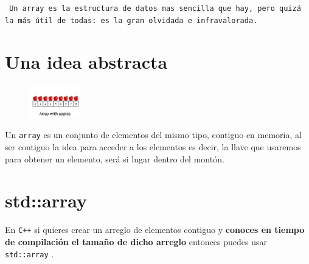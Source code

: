 \documentclass[12pt, fleqn]{report}                             %
\theoremstyle{break}                                            %
\newcommand{\textCode}[1]  { \texttt{#1} }                      %
\newcommand{\Cpp}{\ignorespaces\textCode{C++}}                  %
\begin{document}
        {
            \large
            \textCode{
                Un array es la estructura de datos mas sencilla que hay, pero quizá la más útil
                de todas: es la gran olvidada e infravalorada.
            }
        }

        \clearpage
        \section{Una idea abstracta}

            \begin{figure}
                \includegraphics[width=0.2\textwidth]{ArrayApples}
            \end{figure}

            Un \textCode{array} es un conjunto de elementos del mismo tipo, contiguo en memoria,
            al ser contiguo la idea para acceder a los elementos es decir, la llave que usaremos para 
            obtener un elemento, será si lugar dentro del montón.

        
        \section{std::array}

            En \Cpp si quieres crear un arreglo de elementos contiguo y \textbf{conoces 
            en tiempo de compilación el tamaño de dicho arreglo} entonces puedes usar
            \textCode{std::array}.

\end{document}
